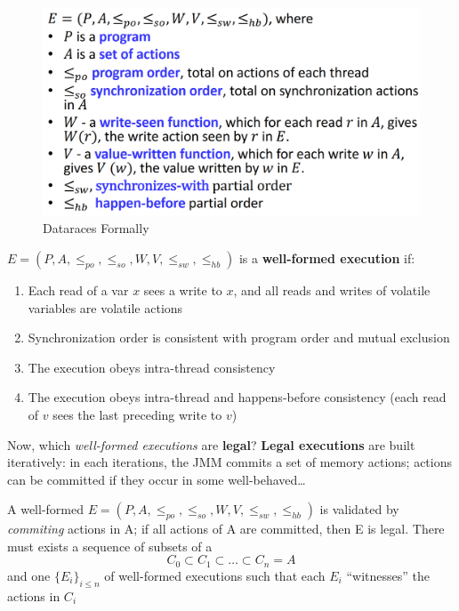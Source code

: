 \begin{figure}[htbp]
   \centering
   \includegraphics{images/jmm_dataraces.png}
   \caption{Dataraces Formally}
   \label{fig:jmm_dataraces}
\end{figure}



$E = (P,A,\leq_{po},\leq_{so},W,V,\leq_{sw},\leq_{hb})$ is a \textbf{well-formed execution} if:
\begin{enumerate}
   \item Each read of a var $x$ sees a write to $x$, and all reads and writes of volatile variables are volatile actions
   \item Synchronization order is consistent with program order and mutual exclusion
   \item The execution obeys intra-thread consistency
   \item The execution obeys intra-thread and happens-before consistency (each read of $v$ sees the last preceding write to $v$)
\end{enumerate}

Now, which \textit{well-formed executions} are \textbf{legal}?
\textbf{Legal executions} are built iteratively:
in each iterations, the JMM commits a set of memory actions;
actions can be committed if they occur in some well-behaved\dots

A well-formed $E = (P,A,\leq_{po},\leq_{so},W,V,\leq_{sw},\leq_{hb})$ is validated by \textit{commiting} actions in A;
if all actions of A are committed, then E is legal.
There must exists a sequence of subsets of a
\[
  C_0 \subset C_1 \subset \dots \subset C_n = A 
\]
and one $\{E_i\}_{i\leq n}$ of well-formed executions such that each $E_i$ ``witnesses'' the actions in $C_i$

